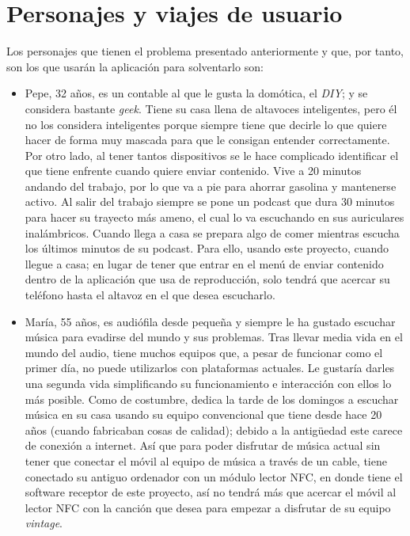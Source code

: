 \section{Personajes y viajes de usuario}
Los personajes que tienen el problema presentado anteriormente y que, por tanto,
son los que usarán la aplicación para solventarlo son:
\begin{itemize}
    \item Pepe, 32 años, es un contable al que le gusta la domótica, el
    \emph{DIY}; y se considera bastante \emph{geek}. Tiene su casa llena de
    altavoces inteligentes, pero él no los considera inteligentes porque siempre
    tiene que decirle lo que quiere hacer de forma muy mascada para que le
    consigan entender correctamente. Por otro lado, al tener tantos dispositivos
    se le hace complicado identificar el que tiene enfrente cuando quiere enviar
    contenido. Vive a 20 minutos andando del trabajo, por lo que va a pie para
    ahorrar gasolina y mantenerse activo. Al salir del trabajo siempre se pone
    un podcast que dura 30 minutos para hacer su trayecto más ameno, el cual lo
    va escuchando en sus auriculares inalámbricos. Cuando llega a casa se
    prepara algo de comer mientras escucha los últimos minutos de su podcast.
    Para ello, usando este proyecto, cuando llegue a casa; en lugar de tener que
    entrar en el menú de enviar contenido dentro de la aplicación que usa de
    reproducción, solo tendrá que acercar su teléfono hasta el altavoz en el que
    desea escucharlo.
    \item María, 55 años, es audiófila desde pequeña y siempre le ha gustado
    escuchar música para evadirse del mundo y sus problemas. Tras llevar media
    vida en el mundo del audio, tiene muchos equipos que, a pesar de funcionar
    como el primer día, no puede utilizarlos con plataformas actuales. Le
    gustaría darles una segunda vida simplificando su funcionamiento e
    interacción con ellos lo más posible. Como de costumbre, dedica la tarde de
    los domingos a escuchar música en su casa usando su equipo convencional que
    tiene desde hace 20 años (cuando fabricaban cosas de calidad); debido a la
    antigüedad este carece de conexión a internet. Así que para poder disfrutar
    de música actual sin tener que conectar el móvil al equipo de música a
    través de un cable, tiene conectado su antiguo ordenador con un módulo
    lector NFC, en donde tiene el software receptor de este proyecto, así no
    tendrá más que acercar el móvil al lector NFC con la canción que desea para
    empezar a disfrutar de su equipo \emph{vintage}.
\end{itemize}



